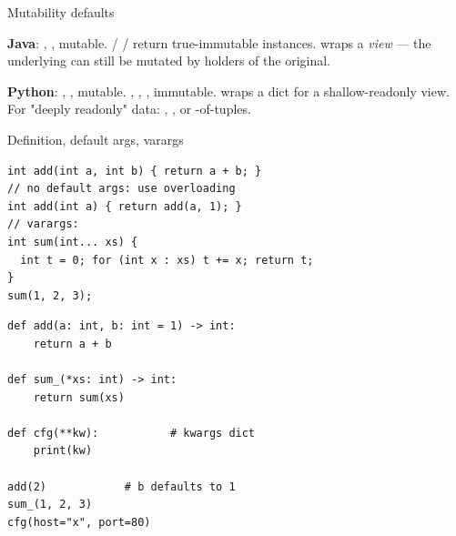 \documentclass[10pt]{article}
\begin{document}
\begin{construct}{Mutability defaults}
\noindent
\begin{minipage}[t]{\linewidth}
\small
\textbf{Java}: , ,  mutable.
 /  /  return true-immutable instances.
 wraps a \emph{view} --- the underlying can still
be mutated by holders of the original.\par
\textbf{Python}: , ,  mutable.
, , ,  immutable.
 wraps a dict for a shallow-readonly view.
For "deeply readonly" data: ,
, or -of-tuples.
\end{minipage}
\end{construct}


\begin{construct}{Definition, default args, varargs}
\noindent
\begin{minipage}[t]{0.485\linewidth}
\begin{lstlisting}[style=java, title=Java]
int add(int a, int b) { return a + b; }
// no default args: use overloading
int add(int a) { return add(a, 1); }
// varargs:
int sum(int... xs) {
  int t = 0; for (int x : xs) t += x; return t;
}
sum(1, 2, 3);
\end{lstlisting}
\end{minipage}\hfill
\begin{minipage}[t]{0.485\linewidth}
\begin{lstlisting}[style=python, title=Python]
def add(a: int, b: int = 1) -> int:
    return a + b

def sum_(*xs: int) -> int:
    return sum(xs)

def cfg(**kw):           # kwargs dict
    print(kw)

add(2)            # b defaults to 1
sum_(1, 2, 3)
cfg(host="x", port=80)
\end{lstlisting}
\end{minipage}
\end{construct}
\end{document}
